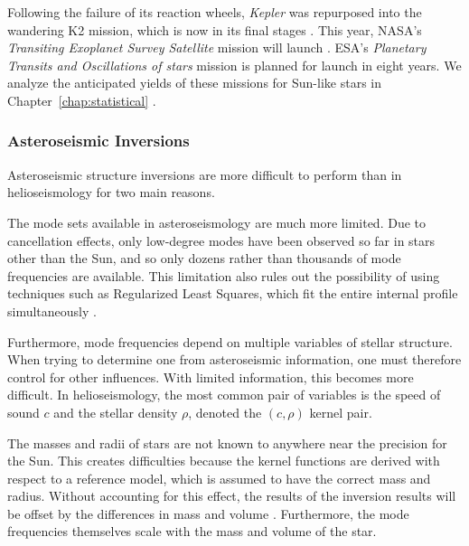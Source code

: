Following the failure of its reaction wheels, \emph{Kepler} was repurposed into the wandering K2 mission, which is now in its final stages \citep[][duration 2013--2018]{2014PASP..126..398H}. 
This year, NASA's \emph{Transiting Exoplanet Survey Satellite} mission will launch \citep[TESS,][expected 2018--2020]{2010AAS...21545006R}. 
ESA's \emph{Planetary Transits and Oscillations of stars} mission \citep[PLATO,][expected 2026--2030]{2014ExA....38..249R} is planned for launch in eight years. 
We analyze the anticipated yields of these missions for Sun-like stars in Chapter~\ref{chap:statistical} \citep{2017apj...839..116a}. 



\subsubsection*{Asteroseismic Inversions}

Asteroseismic structure inversions are more difficult to perform than in helioseismology for two main reasons. 
\begin{description}
    \setlength{\itemindent}{0pt}
    \item[Mode set.]
    The mode sets available in asteroseismology are much more limited. 
    Due to cancellation effects, only low-degree modes have been observed so far in stars other than the Sun, and so only dozens rather than thousands of mode frequencies are available. 
    This limitation also rules out the possibility of using techniques such as Regularized Least Squares, which fit the entire internal profile simultaneously \citep[see, e.g.,][]{basuchaplin2017}. 
    
    Furthermore, mode frequencies depend on multiple variables of stellar structure.
    When trying to determine one from asteroseismic information, one must therefore control for other influences. 
    With limited information, this becomes more difficult. 
    In helioseismology, the most common pair of variables is the speed of sound $c$ and the stellar density $\rho$, denoted the ${(c,\rho)}$ kernel pair. 
    
    \item[Mass and radius.]
    The masses and radii of stars are not known to anywhere near the precision for the Sun. 
    This creates difficulties because the kernel functions are derived with respect to a reference model, which is assumed to have the correct mass and radius. 
    Without accounting for this effect, the results of the inversion results will be offset by the differences in mass and volume \citep[][]{2003Ap&SS.284..153B}. 
    Furthermore, the mode frequencies themselves scale with the mass and volume of the star. 
\end{description}

